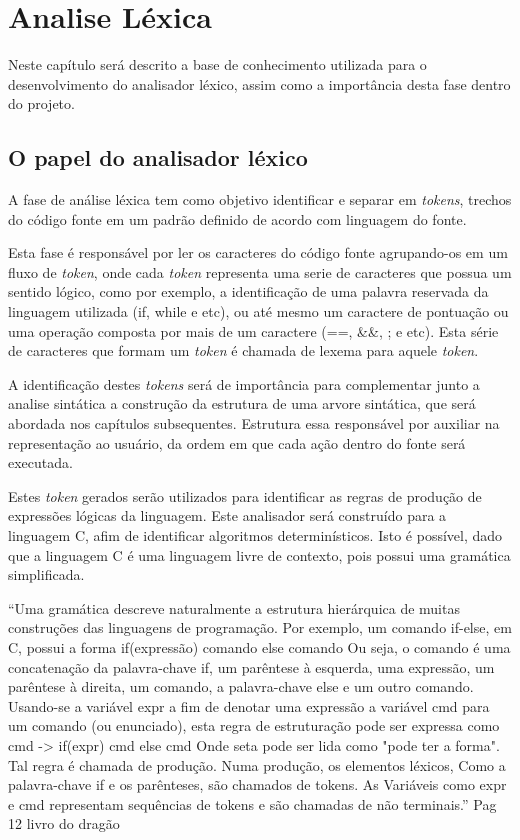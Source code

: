 \chapter{Analise Léxica}\label{fund}
Neste capítulo será descrito a base de conhecimento utilizada para o desenvolvimento do analisador léxico, assim como a importância desta fase dentro do projeto.
\section{O papel do analisador léxico}\label{label1}
A fase de análise léxica tem como objetivo identificar e separar em \textit{tokens}, trechos do código fonte em um padrão definido de acordo com linguagem do fonte.\par
Esta fase é responsável por ler os caracteres do código fonte agrupando-os em um fluxo de \textit{token}, onde cada \textit{token} representa uma serie de caracteres que possua um sentido lógico, como por exemplo, a identificação de uma palavra reservada da linguagem utilizada (if, while e etc), ou até mesmo um caractere de pontuação ou uma operação composta por mais de um caractere (==, \&\&, ; e etc).
Esta série de caracteres que formam um \textit{token} é chamada de lexema para aquele \textit{token}.\par
A identificação destes \textit{tokens} será de importância para complementar junto a analise sintática a construção da estrutura de uma arvore sintática, que será abordada nos capítulos subsequentes. Estrutura essa responsável por auxiliar na representação ao usuário, da ordem em que cada ação dentro do fonte será executada.\par
Estes \textit{token} gerados serão utilizados para identificar as regras de produção de expressões lógicas da linguagem.
Este analisador será construído para a linguagem C, afim de identificar algoritmos determinísticos. Isto é possível, dado que a linguagem C é uma linguagem livre de contexto, pois possui uma gramática simplificada.


\begin{citacao}
``Uma gramática descreve naturalmente a estrutura hierárquica de muitas construções das linguagens de programação. Por exemplo, um comando if-else, em C, possui a forma
if(expressão) comando else comando
Ou seja, o comando é uma concatenação da palavra-chave if, um parêntese à esquerda, uma expressão, um parêntese à direita, um comando, a palavra-chave else e um outro comando. Usando-se a variável expr a fim de denotar uma expressão a variável cmd para um comando (ou enunciado), esta regra de estruturação pode ser expressa como 
cmd -> if(expr) cmd else cmd
Onde seta pode ser lida como "pode ter a forma". Tal regra é chamada de produção. Numa produção, os elementos léxicos,
Como a palavra-chave if e os parênteses, são chamados de tokens. 
As Variáveis como expr e cmd representam sequências de tokens e são chamadas de não terminais.'' Pag 12 livro do dragão \cite{wang}
\end{citacao}


